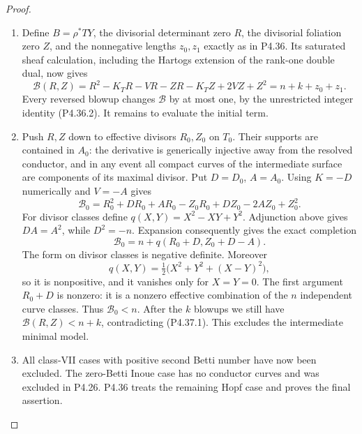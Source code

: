 \begin{proof}
\begin{enumerate}[label={$\langle1\rangle$\arabic*.},leftmargin=*]
\item Define $B=\rho^*TY$, the divisorial determinant zero
$R$, the divisorial foliation zero $Z$, and the
nonnegative lengths $z_0,z_1$ exactly as in P4.36.
Its saturated sheaf calculation, including the
Hartogs extension of the rank-one double dual,
now gives
\[
 \mathcal B(R,Z)
 =R^2-K_TR-VR-ZR-K_TZ+2VZ+Z^2
 =n+k+z_0+z_1.                                  \tag{P4.37.1}
\]
Every reversed blowup changes $\mathcal B$ by at
most one, by the unrestricted integer identity
(P4.36.2). It remains to evaluate the initial term.

\item Push $R,Z$ down to effective divisors $R_0,Z_0$
on $T_0$. Their supports are contained in $A_0$:
the derivative is generically injective away from
the resolved conductor, and in any event all
compact curves of the intermediate surface are
components of its maximal divisor. Put $D=D_0$,
$A=A_0$. Using $K=-D$ numerically and $V=-A$ gives
\[
 \mathcal B_0
 =R_0^2+DR_0+AR_0-Z_0R_0+DZ_0-2AZ_0+Z_0^2.
\]
For divisor classes define
$q(X,Y)=X^2-XY+Y^2$.
Adjunction above gives $DA=A^2$, while $D^2=-n$.
Expansion consequently gives the exact completion
\[
 \mathcal B_0
       =n+q(R_0+D,Z_0+D-A).                     \tag{P4.37.2}
\]
The form on divisor classes is negative definite.
Moreover
\[
 q(X,Y)=\tfrac12\bigl(X^2+Y^2+(X-Y)^2\bigr),
\]
so it is nonpositive, and it vanishes only for
$X=Y=0$. The first argument $R_0+D$ is nonzero:
it is a nonzero effective combination of the
$n$ independent curve classes. Thus
$\mathcal B_0<n$.
After the $k$ blowups we still have
$\mathcal B(R,Z)<n+k$, contradicting (P4.37.1).
This excludes the intermediate minimal model.

\item All class-VII cases with positive second Betti
number have now been excluded. The zero-Betti
Inoue case has no conductor curves and was
excluded in P4.26. P4.36 treats the remaining
Hopf case and proves the final assertion.

\end{enumerate}
\end{proof}
